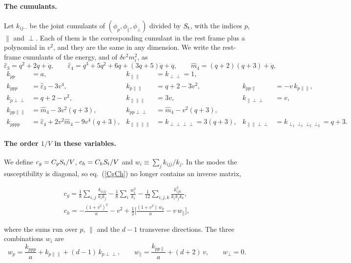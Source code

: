\documentclass[11pt,aps,preprint,nofootinbib,superscriptaddress,tightenlines]{revtex4-2}
\def\st{\begin{equation}}
\def\stp{\end{equation}}
\def\Eq#1{eq.~(\ref{#1})}
\let\oldparagraph\paragraph
\renewcommand{\paragraph}{\par\bigskip\oldparagraph}
\begin{document}
\paragraph{The cumulants.}  Let $k_{ij\cdots}$ be the joint cumulants of $(\phi_p,\phi_\parallel,\phi_\perp)$ divided by $S_{\rm t}$, with the indices
$p$, $\parallel$ and $\perp$.  Each of them is the corresponding cumulant in the rest frame plus a polynomial in $v^2$, and they are the same in any
dimension.  We write the rest-frame cumulants of the energy, and of $\delta e^2m_i^2$, as
\st
\hat\varepsilon_3=q^2+2q+\dot q,\qquad \hat\varepsilon_4=q^3+5q^2+6q+(3q+5)\dot q+\ddot q,\qquad \hat m_4=(q+2)(q+3)+\dot q ,
\stp
\begin{align}
k_{pp}&=a, & k_{\parallel\parallel}&=k_{\perp\perp}=1, \nonumber\\
k_{ppp}&=\hat\varepsilon_3-3v^4, & k_{p\parallel\parallel}&=q+2-3v^2, & k_{pp\parallel}&=-v\,k_{p\parallel\parallel}, \nonumber\\
k_{p\perp\perp}&=q+2-v^2, & k_{\parallel\parallel\parallel}&=3v, & k_{\parallel\perp\perp}&=v, \nonumber\\
k_{pp\parallel\parallel}&=\hat m_4-3v^2(q+3), & k_{pp\perp\perp}&=\hat m_4-v^2(q+3), \nonumber\\
k_{pppp}&=\hat\varepsilon_4+2v^2\hat m_4-9v^4(q+3), & k_{\parallel\parallel\parallel\parallel}&=k_{\perp\perp\perp\perp}=3(q+3), &
k_{\parallel\parallel\perp\perp}&=k_{\perp_1\perp_1\perp_2\perp_2}=q+3 .
\end{align}

\paragraph{The order $1/V$ in these variables.}  We define $c_g=C_gS_{\rm t}/V$, $c_h=C_hS_{\rm t}/V$ and $w_i\equiv\sum_jk_{ijj}/k_j$.  In the modes
the susceptibility is diagonal, so \Eq{CgCh} no longer contains an inverse matrix,
\begin{keyeq}
\st
\begin{gathered}
c_g=\frac18\sum_{i,j}\frac{k_{iijj}}{k_ik_j}-\frac18\sum_i\frac{w_i^2}{k_i}-\frac1{12}\sum_{i,j,k}\frac{k_{ijk}^2}{k_ik_jk_k},\\
c_h=-\frac{(1+v^2)^2}a-v^2+\frac12\Big[\frac{(1+v^2)\,w_p}a-v\,w_\parallel\Big] ,
\end{gathered}
\label{cdiag}
\stp
\end{keyeq}
where the sums run over $p$, $\parallel$ and the $d-1$ transverse directions.  The three combinations $w_i$ are
\st
w_p=\frac{k_{ppp}}a+k_{p\parallel\parallel}+(d-1)\,k_{p\perp\perp},\qquad w_\parallel=\frac{k_{pp\parallel}}a+(d+2)\,v,\qquad w_\perp=0 .
\stp
\end{document}
